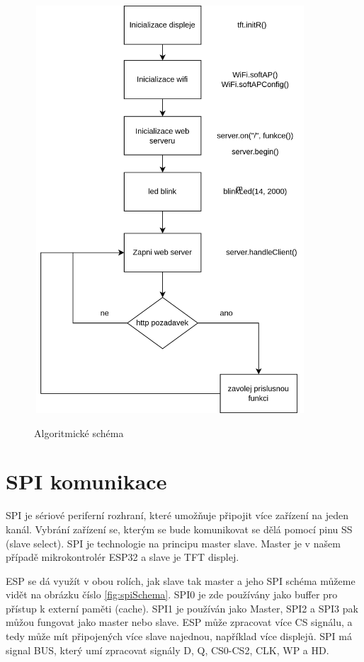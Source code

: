 \begin{figure}[h]%
  \centering
  \includegraphics[width=4in,height=6in]{img/program.png}\\[1pt]
  \caption{Algoritmické schéma}
  \label{fig:schema}
\end{figure} 

\section{SPI komunikace}
SPI je sériové periferní rozhraní, které umožňuje připojit více zařízení na jeden kanál. Vybrání zařízení se, kterým se bude komunikovat se dělá pomocí pinu SS (slave select). SPI je technologie na principu master slave. Master je v našem případě mikrokontrolér ESP32 a slave je TFT displej.

ESP se dá využít v obou rolích, jak slave tak master a jeho SPI schéma můžeme vidět na obrázku číslo \ref{fig:spiSchema}. SPI0 je zde používány jako buffer pro přístup k externí paměti (cache). SPI1 je používán jako Master, SPI2 a SPI3 pak můžou fungovat jako master nebo slave.  ESP může zpracovat více CS signálu, a tedy může mít připojených více slave najednou, například více displejů. SPI má signal BUS, který umí zpracovat signály D, Q, CS0-CS2, CLK, WP a HD. 

